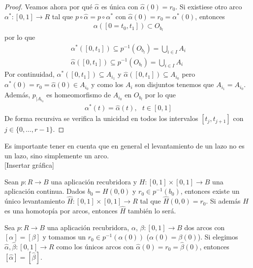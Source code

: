 \begin{lema}
\begin{proof}
       Veamos ahora por qué $\hat{\alpha}$ es única con $\hat{\alpha}(0)=r_0$. Si existiese otro arco $\alpha^*:[0,1]\to R$ tal que $p\circ \hat{\alpha} = p\circ \alpha^*$ con $\hat{\alpha}(0) = r_0 = \alpha^*(0)$, entonces 
       \begin{gather*}
            \alpha([0=t_0,t_1]) \subset O_{b_l}
       \end{gather*}
       por lo que 
       \begin{gather*}
            \alpha^*([0,t_1]) \subseteq p^{-1}(O_{b_l}) = \bigcup\limits_{i\in I} A_i\\
            \hat{\alpha}([0,t_1]) \subseteq p^{-1}(O_{b_l}) = \bigcup\limits_{i\in I} A_i
       \end{gather*}
       Por continuidad, $\alpha^*([0,t_1])\subseteq A_{i_1}$ y $\hat{\alpha}([0,t_1])\subseteq A_{i_0}$ pero $\alpha^*(0)=r_0=\hat{\alpha}(0)\in A_{i_0}$ y como los $A_i$ son disjuntos tenemos que $A_{i_1} = A_{i_0}$. Además, $p_{|A_{i_0}}$ es homeomorfismo de $A_{i_0}$ en $O_{b_l}$ por lo que 
       \begin{gather*}
            \alpha^*(t) = \hat{\alpha}(t),\ \ \ t\in [0,1]
       \end{gather*}
       De forma recursiva se verifica la unicidad en todos los intervalos $[t_j, t_{j+1}]$ con $j\in \{0,\dots,r-1\}$.
    \end{proof}
\end{lema}

\begin{observacion}
    Es importante tener en cuenta que en general el levantamiento de un lazo no es un lazo, sino simplemente un arco.\\

    [Insertar gráfica]
\end{observacion}

\begin{lema}
    Sean $p:R \to B$ una aplicación recubridora y $H:[0,1]\times[0,1]\to B$ una aplicación continua. Dados $b_0=H(0,0)$ y $r_0\in p^{-1}(b_0)$, entonces existe un único levantamiento $\hat{H}:[0,1]\times[0,1]\to R$ tal que $\hat{H}(0,0) = r_0$. Si además $H$ es una homotopía por arcos, entonces $\hat{H}$ también lo será.
\end{lema}

\begin{coro}
    Sea $p:R\to B$ una aplicación recubridora, $\alpha$, $\beta:[0,1]\to B$ dos arcos con $[\alpha]=[\beta]$ y tomamos un $r_0\in p^{-1}(\alpha(0))$ ($\alpha(0)=\beta(0)$). Si elegimos $\hat{\alpha}, \hat{\beta}:[0,1]\to R$ como los únicos arcos con $\hat{\alpha}(0)=r_0=\hat{\beta}(0)$, entonces $[\hat{\alpha}] = [\hat{\beta}]$.
\end{coro}

